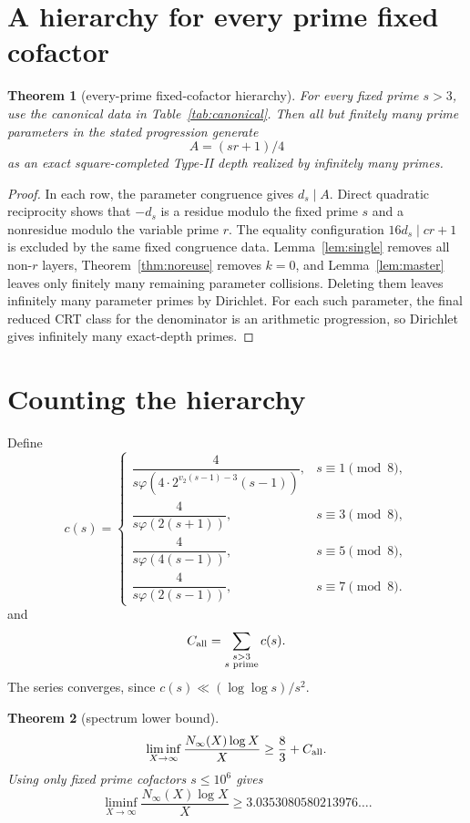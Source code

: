 \documentclass[11pt]{article}
\newtheorem{theorem}{Theorem}
\theoremstyle{definition}
\begin{document}
\section{A hierarchy for every prime fixed cofactor}
\begin{theorem}[every-prime fixed-cofactor hierarchy]\label{thm:allprime}
For every fixed prime $s>3$, use the canonical data in Table~\ref{tab:canonical}. Then all but finitely many prime parameters in the stated progression generate
\[
A=(sr+1)/4
\]
as an exact square-completed Type-II depth realized by infinitely many primes.
\end{theorem}

\begin{proof}
In each row, the parameter congruence gives $d_s\mid A$. Direct quadratic reciprocity shows that $-d_s$ is a residue modulo the fixed prime $s$ and a nonresidue modulo the variable prime $r$. The equality configuration $16d_s\mid cr+1$ is excluded by the same fixed congruence data. Lemma~\ref{lem:single} removes all non-$r$ layers, Theorem~\ref{thm:noreuse} removes $k=0$, and Lemma~\ref{lem:master} leaves only finitely many remaining parameter collisions. Deleting them leaves infinitely many parameter primes by Dirichlet. For each such parameter, the final reduced CRT class for the denominator is an arithmetic progression, so Dirichlet gives infinitely many exact-depth primes.
\end{proof}

\section{Counting the hierarchy}
Define
\[
c(s)=
\begin{cases}
\dfrac{4}{s\varphi(4\cdot2^{v_2(s-1)-3}(s-1))},&s\equiv1\pmod8,\\[6pt]
\dfrac{4}{s\varphi(2(s+1))},&s\equiv3\pmod8,\\[6pt]
\dfrac{4}{s\varphi(4(s-1))},&s\equiv5\pmod8,\\[6pt]
\dfrac{4}{s\varphi(2(s-1))},&s\equiv7\pmod8.
\end{cases}
\]
and
\[
C_{\rm all}=\sum_{\substack{s>3\\s\text{ prime}}}c(s).
\]
The series converges, since $c(s)\ll(\log\log s)/s^2$.

\begin{theorem}[spectrum lower bound]\label{thm:count}
\[
\liminf_{X\to\infty}\frac{N_\infty(X)\log X}{X}\ge\frac83+C_{\rm all}.
\]
Using only fixed prime cofactors $s\le10^6$ gives
\[
\boxed{\liminf_{X\to\infty}\frac{N_\infty(X)\log X}{X}\ge3.0353080580213976\ldots .}
\]
\end{theorem}
\end{document}
